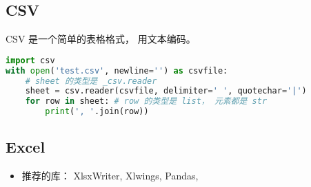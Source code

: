 
\begin{issues}
\issueDraft
\end{issues}

\subsection{CSV}
CSV 是一个简单的表格格式， 用文本编码。
\begin{lstlisting}[language=python]
import csv
with open('test.csv', newline='') as csvfile:
    # sheet 的类型是 _csv.reader
    sheet = csv.reader(csvfile, delimiter=' ', quotechar='|')
    for row in sheet: # row 的类型是 list， 元素都是 str
        print(', '.join(row))
\end{lstlisting}

\subsection{Excel}
\begin{itemize}
\item 推荐的库： XlsxWriter, Xlwings, Pandas, 
\end{itemize}
